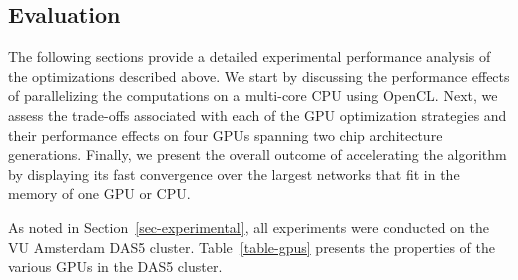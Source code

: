 \subsection{Evaluation}
\label{sec-evaluation}

The following sections provide a detailed experimental performance analysis
of the optimizations described above. We start by discussing the performance
effects of parallelizing the computations
on a multi-core CPU using OpenCL.
%
Next, we assess the trade-offs associated with each of the GPU optimization
strategies and their performance effects on four GPUs spanning two chip
architecture generations.
%
Finally, we present the overall outcome of accelerating the algorithm by
displaying its fast convergence over the largest networks that fit in the
memory of one GPU or CPU.

As noted in Section~\ref{sec-experimental}, all experiments were conducted on the VU Amsterdam DAS5 cluster.
Table~\ref{table-gpus} presents the properties of the various GPUs in
the DAS5 cluster.

% 


